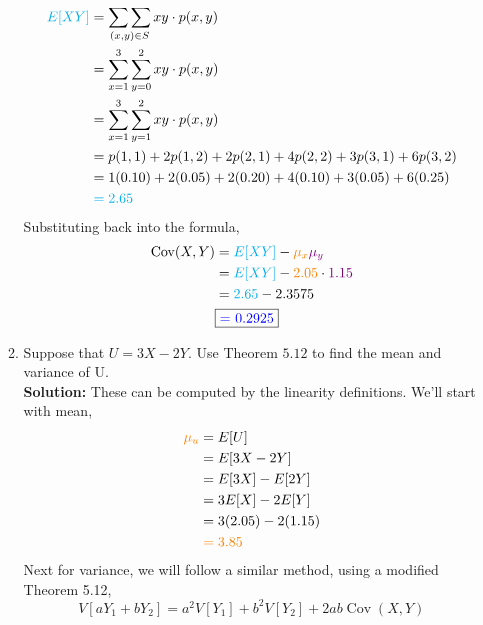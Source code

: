 \documentclass[12pt]{article}
\begin{document}
\begin{enumerate}
\begin{enumerate}
        \begin{align}
            \color{cyan} E[XY] \color{black} &= \mathop{\sum\sum}_{(x,y) \in S}xy\cdot p(x,y) \notag\\
            &= \sum_{x=1}^{3}\sum_{y=0}^2 xy \cdot p(x,y) \notag\\
            &= \sum_{x=1}^{3}\sum_{y=1}^2 xy \cdot p(x,y) \notag\\
            &= p(1,1) + 2p(1,2) + 2p(2,1) + 4p(2,2) + 3p(3,1) + 6p(3,2)\notag\\
            &= 1(0.10) + 2(0.05) + 2(0.20) + 4(0.10) + 3(0.05) + 6(0.25) \notag\\
            & \color{cyan}= 2.65\notag
        \end{align}
        Substituting back into the formula,
        \begin{align}
            \operatorname{Cov}(X, Y) &= \color{cyan} E[XY] \color{black} - \color{orange} \mu_x \color{violet} \mu_y \notag\\
            &= \color{cyan} E[XY] \color{black} - \color{orange} 2.05 \color{black} \cdot \color{violet} 1.15 \notag\\
            &= \color{cyan} 2.65 \color{black} - 2.3575\notag\\
            & \fbox{\color{blue}= 0.2925} \notag 
        \end{align}
        \vspace{0.15in}
        \item Suppose that $U= 3X - 2Y$. Use Theorem $5.12$ to find the mean and variance of U.
        \vspace{0.15in}\\
        \textbf{Solution:} These can be computed by the linearity definitions. We'll start with mean,
        \begin{align}
            \color{orange}\mu_u\color{black} &= E[U] \notag\\
            &= E[3X-2Y] \notag\\
            &= E[3X] - E[2Y] \notag\\
            &= 3E[X]- 2E[Y] \notag\\
            &= 3(2.05) - 2(1.15)\notag\\
            & \color{orange} = 3.85 \notag
        \end{align}
        Next for variance, we will follow a similar method, using a modified Theorem 5.12, 
        $$V[aY_1 + bY_2] = a^2V[Y_1] + b^2V[Y_2] + 2ab\operatorname{Cov}(X,Y)$$
        \begin{align}

\end{align}
\end{enumerate}
\end{enumerate}
\end{document}
